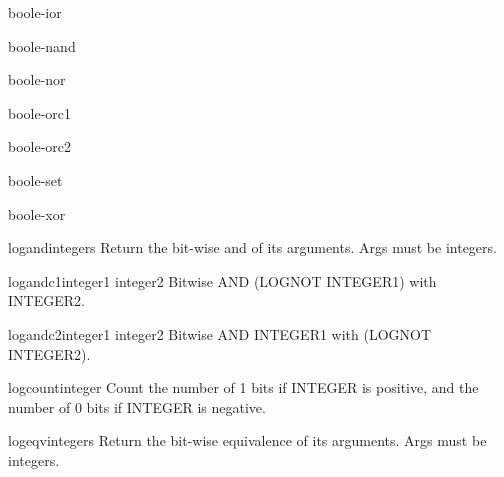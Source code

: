 \documentclass[10pt,english]{book}
\begin{document}
\begin{constant}{boole-ior}{}
  
\end{constant}

\begin{constant}{boole-nand}{}
  
\end{constant}

\begin{constant}{boole-nor}{}
  
\end{constant}

\begin{constant}{boole-orc1}{}
  
\end{constant}

\begin{constant}{boole-orc2}{}
  
\end{constant}

\begin{constant}{boole-set}{}
  
\end{constant}

\begin{constant}{boole-xor}{}
  
\end{constant}

\begin{function}{logand}{\rest integers}
  Return the bit-wise and of its arguments. Args must be integers.
\end{function}

\begin{function}{logandc1}{integer1 integer2}
  Bitwise AND (LOGNOT INTEGER1) with INTEGER2.
\end{function}

\begin{function}{logandc2}{integer1 integer2}
  Bitwise AND INTEGER1 with (LOGNOT INTEGER2).
\end{function}

\begin{function}{logcount}{integer}
  Count the number of 1 bits if INTEGER is positive, and the number of 0 bits
  if INTEGER is negative.
\end{function}

\begin{function}{logeqv}{\rest integers}
  Return the bit-wise equivalence of its arguments. Args must be integers.
\end{function}
\end{document}
